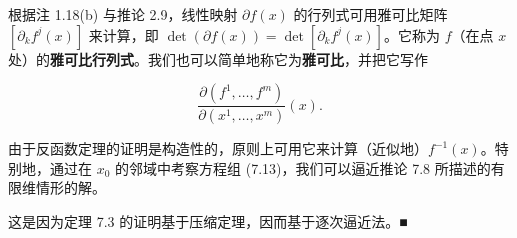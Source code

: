 \begin{remark}

\begin{items}
\item

根据注 1.18(b) 与推论 2.9，线性映射 $ \partial f(x) $ 的行列式可用雅可比矩阵 $ \left[\partial_{k}f^{j}(x)\right] $ 来计算，即 $ \det(\partial f(x)) = \det\left[\partial_{k}f^{j}(x)\right] $。它称为 $ f $（在点 $ x $ 处）的\textbf{雅可比行列式}。我们也可以简单地称它为\textbf{雅可比}，并把它写作

\[
\frac{\partial(f^{1}, \ldots, f^{m})}{\partial(x^{1}, \ldots, x^{m})}(x) .
\]
\item

由于反函数定理的证明是构造性的，原则上可用它来计算（近似地）$ f^{-1}(x) $。特别地，通过在 $ x_{0} $ 的邻域中考察方程组 (7.13)，我们可以逼近推论 7.8 所描述的有限维情形的解。

\proofhead
这是因为定理 7.3 的证明基于压缩定理，因而基于逐次逼近法。\nobreak\hspace{0.35em}■
\end{items}

\end{remark}

\exerciseshead

